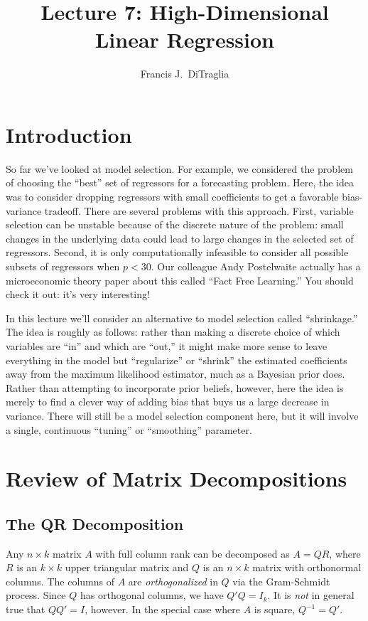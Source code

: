\documentclass[12pt]{article}
\theoremstyle{definition}
\begin{document}
\title{Lecture 7: High-Dimensional Linear Regression}

\author{Francis J.\ DiTraglia}

\maketitle 

\section{Introduction}
So far we've looked at model selection. For example, we considered the problem of choosing the ``best'' set of regressors for a forecasting problem. Here, the idea was to consider dropping regressors with small coefficients to get a favorable bias-variance tradeoff. There are several problems with this approach. First, variable selection can be unstable because of the discrete nature of the problem: small changes in the underlying data could lead to large changes in the selected set of regressors. Second, it is only computationally infeasible to consider all possible subsets of regressors when $p < 30$. Our colleague Andy Postelwaite actually has a microeconomic theory paper about this called ``Fact Free Learning.'' You should check it out: it's very interesting!

In this lecture we'll consider an alternative to model selection called ``shrinkage.'' The idea is roughly as follows: rather than making a discrete choice of which variables are ``in'' and which are ``out,'' it might make more sense to leave everything in the model but ``regularize'' or ``shrink'' the estimated coefficients away from the maximum likelihood estimator, much as a Bayesian prior does. Rather than attempting to incorporate prior beliefs, however, here the idea is merely to find a clever way of adding bias that buys us a large decrease in variance. There will still be a model selection component here, but it will involve a single, continuous ``tuning'' or ``smoothing'' parameter.

\section{Review of Matrix Decompositions}
\subsection{The QR Decomposition}
Any $n\times k$ matrix $A$ with full column rank can be decomposed as $A = QR$, where $R$ is an $k\times k$ upper triangular matrix and $Q$ is an $n\times k$ matrix with orthonormal columns. The columns of $A$ are \emph{orthogonalized} in $Q$ via the Gram-Schmidt process. Since $Q$ has orthogonal columns, we have $Q'Q = I_k$. It is \emph{not} in general true that $QQ' = I$, however. In the special case where $A$ is square, $Q^{-1} = Q'$.
\end{document}
